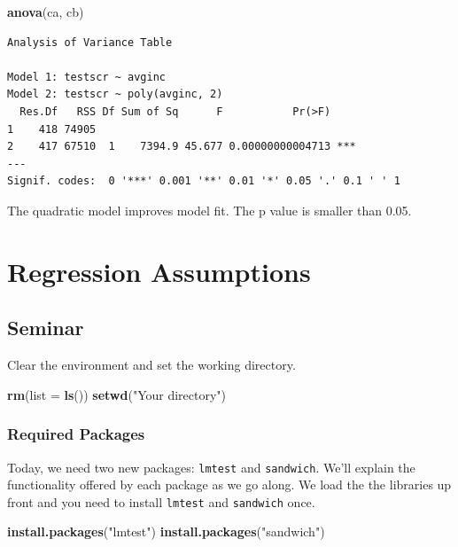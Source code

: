 \documentclass[]{article}
\newenvironment{Shaded}{\begin{snugshade}}{\end{snugshade}}
\newcommand{\KeywordTok}[1]{\textcolor[rgb]{0.13,0.29,0.53}{\textbf{#1}}}
\newcommand{\DataTypeTok}[1]{\textcolor[rgb]{0.13,0.29,0.53}{#1}}
\newcommand{\StringTok}[1]{\textcolor[rgb]{0.31,0.60,0.02}{#1}}
\newcommand{\NormalTok}[1]{#1}
\theoremstyle{definition}
\theoremstyle{definition}
\theoremstyle{definition}
\theoremstyle{remark}
\begin{document}
\begin{Shaded}
\begin{Highlighting}[]
\KeywordTok{anova}\NormalTok{(ca, cb)}
\end{Highlighting}
\end{Shaded}

\begin{verbatim}
Analysis of Variance Table

Model 1: testscr ~ avginc
Model 2: testscr ~ poly(avginc, 2)
  Res.Df   RSS Df Sum of Sq      F           Pr(>F)    
1    418 74905                                         
2    417 67510  1    7394.9 45.677 0.00000000004713 ***
---
Signif. codes:  0 '***' 0.001 '**' 0.01 '*' 0.05 '.' 0.1 ' ' 1
\end{verbatim}

The quadratic model improves model fit. The p value is smaller than
0.05.

\section{Regression Assumptions}\label{regression-assumptions}

\subsection{Seminar}\label{seminar-8}

Clear the environment and set the working directory.

\begin{Shaded}
\begin{Highlighting}[]
\KeywordTok{rm}\NormalTok{(}\DataTypeTok{list =} \KeywordTok{ls}\NormalTok{())}
\KeywordTok{setwd}\NormalTok{(}\StringTok{"Your directory"}\NormalTok{)}
\end{Highlighting}
\end{Shaded}

\subsubsection{Required Packages}\label{required-packages}

Today, we need two new packages: \texttt{lmtest} and \texttt{sandwich}.
We'll explain the functionality offered by each package as we go along.
We load the the libraries up front and you need to install
\texttt{lmtest} and \texttt{sandwich} once.

\begin{Shaded}
\begin{Highlighting}[]
\KeywordTok{install.packages}\NormalTok{(}\StringTok{"lmtest"}\NormalTok{)}
\KeywordTok{install.packages}\NormalTok{(}\StringTok{"sandwich"}\NormalTok{)}
\end{Highlighting}
\end{Shaded}
\end{document}
